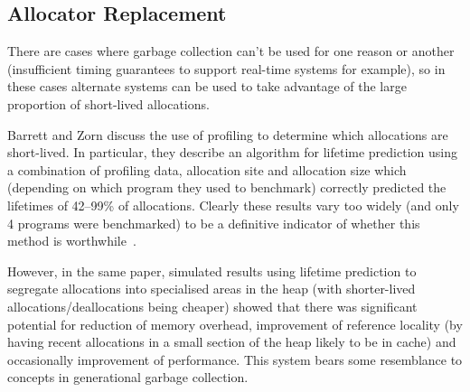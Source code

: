 \subsection{Allocator Replacement}

There are cases where garbage collection can't be used for one reason or another (insufficient timing guarantees to support real-time systems for example), so in these cases alternate systems can be used to take advantage of the large proportion of short-lived allocations.

Barrett and Zorn discuss the use of profiling to determine which allocations are short-lived. In particular, they describe an algorithm for lifetime prediction using a combination of profiling data, allocation site and allocation size which (depending on which program they used to benchmark) correctly predicted the lifetimes of 42–99\% of allocations. Clearly these results vary too widely (and only 4 programs were benchmarked) to be a definitive indicator of whether this method is worthwhile~\cite{predictors}.

However, in the same paper, simulated results using lifetime prediction to segregate allocations into specialised areas in the heap (with shorter-lived allocations/deallocations being cheaper) showed that there was significant potential for reduction of memory overhead, improvement of reference locality (by having recent allocations in a small section of the heap likely to be in cache) and occasionally improvement of performance. This system bears some resemblance to concepts in generational garbage collection.
